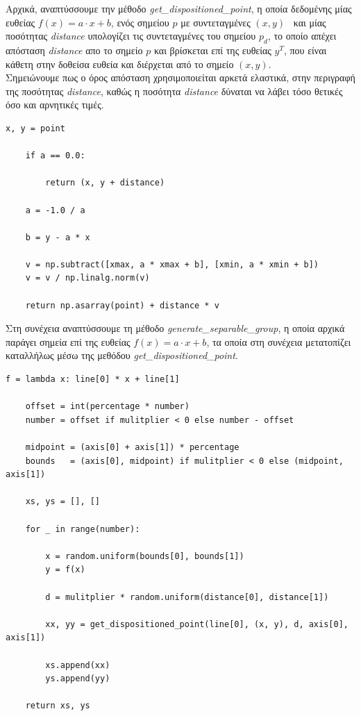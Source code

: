 \documentclass[12pt]{article}
\begin{document}
Αρχικά, αναπτύσσουμε την μέθοδο \textit{get\_dispositioned\_point},
η οποία δεδομένης μίας ευθείας \( f(x) = a \cdot x + b \),
ενός σημείου \( p \) με συντεταγμένες \( (x, y) \) \ και
μίας ποσότητας \textit{distance} υπολογίζει τις συντεταγμένες του σημείου \( p_d \),
το οποίο απέχει απόσταση \textit{distance} απο το σημείο \( p \) και
βρίσκεται επί της ευθείας \( y^T \), που είναι κάθετη στην δοθείσα ευθεία και
διέρχεται από το σημείο \( (x, y) \). \\

Σημειώνουμε πως ο όρος απόσταση χρησιμοποιείται αρκετά ελαστικά,
στην περιγραφή της ποσότητας \textit{distance},
καθώς η ποσότητα \textit{distance} δύναται να λάβει τόσο θετικές όσο και αρνητικές τιμές. \\

\begin{lstlisting}[caption={Η μέθοδος \textit{get\_dispositioned\_point}}]
    x, y = point

    if a == 0.0:

        return (x, y + distance)

    a = -1.0 / a

    b = y - a * x

    v = np.subtract([xmax, a * xmax + b], [xmin, a * xmin + b])
    v = v / np.linalg.norm(v)

    return np.asarray(point) + distance * v
\end{lstlisting}

\pagebreak

Στη συνέχεια αναπτύσσουμε τη μέθοδο \textit{generate\_separable\_group},
η οποία αρχικά παράγει σημεία επί της ευθείας \( f(x) = a \cdot x + b \),
τα οποία στη συνέχεια μετατοπίζει καταλλήλως μέσω της μεθόδου \textit{get\_dispositioned\_point}. \\

\begin{lstlisting}[caption={Η μέθοδος \textit{generate\_separable\_group}}]
    f = lambda x: line[0] * x + line[1]

    offset = int(percentage * number)
    number = offset if mulitplier < 0 else number - offset

    midpoint = (axis[0] + axis[1]) * percentage
    bounds   = (axis[0], midpoint) if mulitplier < 0 else (midpoint, axis[1])

    xs, ys = [], []

    for _ in range(number):

        x = random.uniform(bounds[0], bounds[1])
        y = f(x)

        d = mulitplier * random.uniform(distance[0], distance[1])

        xx, yy = get_dispositioned_point(line[0], (x, y), d, axis[0], axis[1])

        xs.append(xx)
        ys.append(yy)

    return xs, ys
\end{lstlisting}
\end{document}

